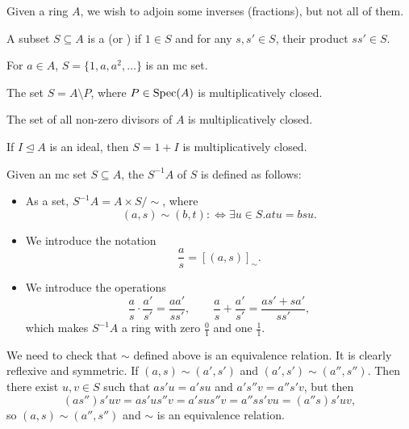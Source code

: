 
Given a ring $A$, we wish to adjoin some inverses (fractions), but not all of
them.

\begin{definition}
  A subset $S \subseteq A$ is a  (or
  ) if $1 \in S$ and for any $s, s' \in S$, their product $s s'
  \in S$.
\end{definition}

\begin{example}
  For $a \in A$, $S = \{1, a, a^2, \ldots\}$ is an mc set.
\end{example}

\begin{example}
  The set $S = A \setminus P$, where $P \in \operatorname{Spec}(A)$ is multiplicatively
  closed.
\end{example}

\begin{example}
  The set of all non-zero divisors of $A$ is multiplicatively closed.
\end{example}

\begin{example}
  If $I \trianglelefteq A$ is an ideal, then $S = 1 + I$ is multiplicatively
  closed.
\end{example}

\begin{definition}
  Given an mc set $S \subseteq A$, the  $S^{-1} A$ of $S$ is
  defined as follows:
  \begin{itemize}
  \item As a set, $S^{-1} A = A \times S / \sim$, where
	\[
	  (a, s) \sim (b, t) :\iff \exists u \in S . atu = bsu.
	\]
  \item We introduce the notation
	\[
	  \frac{a}{s} = [(a,s)]_\sim.
	\]
  \item We introduce the operations
	\[
	  \frac{a}{s} \cdot \frac{a'}{s'} = \frac{aa'}{ss'},
	  \qquad
	  \frac{a}{s} + \frac{a'}{s'} = \frac{as' + sa'}{ss'},
	\]
	which makes $S^{-1} A$ a ring with zero $\frac{0}{1}$ and one $\frac{1}{1}$.
  \end{itemize}
\end{definition}

We need to check that $\sim$ defined above is an equivalence relation.
It is clearly reflexive and symmetric.
If $(a,s) \sim (a', s')$ and $(a', s') \sim (a'', s'')$.
Then there exist $u, v \in S$ such that $as'u = a'su$ and $a's''v = a''s'v$, but
then
\[
  (a s'') s'uv = as'u s''v = a'su s''v = a'' s s' v u = (a'' s) s'uv,
\]
so $(a, s) \sim (a'', s'')$ and $\sim$ is an equivalence relation.


